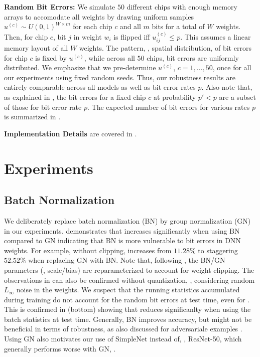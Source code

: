 \textbf{Random Bit Errors:} We simulate $50$ different chips with enough memory arrays to accomodate all weights by drawing uniform samples $u^{(c)} \sim U(0, 1)^{W \times m}$ for each chip $c$ and all $m$ bits for a total of $W$ weights. Then, for chip $c$, bit $j$ in weight $w_i$ is flipped iff $u^{(c)}_{ij} \leq p$. This assumes a linear memory layout of all $W$ weights. The pattern, \ie, spatial distribution, of bit errors for chip $c$ is fixed by $u^{(c)}$, while across all $50$ chips, bit errors are uniformly distributed. We emphasize that we pre-determine $u^{(c)}$, $c = 1,\ldots,50$, once for all our experiments using fixed random seeds. Thus, our robustness results are entirely comparable across all models as well as bit error rates $p$. Also note that, as explained in , the bit errors for a fixed chip $c$ at probability $p' < p$ are a subset of those for bit error rate $p$. The expected number of bit errors for various rates $p$ is summarized in .

\textbf{Implementation Details} are covered in .

\section{Experiments}
\label{sec:supp-experiments}

\subsection{Batch Normalization}
\label{subsec:supp-experiments-bn}

We deliberately replace batch normalization (BN) \cite{IoffeICML2015} by group normalization (GN) \cite{WuECCV2018} in our experiments.  demonstrates that \RTE increases significantly when using BN compared to GN indicating that BN is more vulnerable to bit errors in DNN weights. For example, without clipping, \RTE increases from $11.28\%$ to staggering $52.52\%$ when replacing GN with BN. Note that, following , the BN/GN parameters (\ie, scale/bias) are reparameterized to account for weight clipping. The observations in  can also be confirmed without quantization, \eg, considering random $L_\infty$ noise in the weights. We suspect that the running statistics accumulated during training do not account for the random bit errors at test time, even for \Random. This is confirmed in  (bottom) showing that \RTE reduces significanlty when using the batch statistics at test time. Generally, BN improves accuracy, but might not be beneficial in terms of robustness, as also discussed for adversariale examples \cite{GallowayARXIV2019}. Using GN also motivates our use of SimpleNet instead of, \eg, ResNet-50, which generally performs worse with GN, \cf {}.

